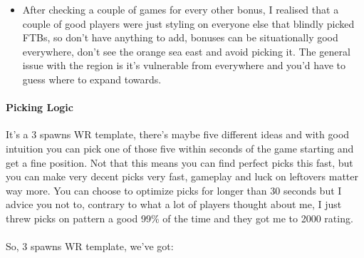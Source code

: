 \begin{itemize}
\begin{enumerate}
    \end{enumerate}
    \item After checking a couple of games for every other bonus, I realised that a couple of good players were just styling on everyone else that blindly picked FTBs, so don't have anything to add, bonuses can be situationally good everywhere, don't see the orange sea east and avoid picking it. The general issue with the region is it's vulnerable from everywhere and you'd have to guess where to expand towards.
\end{itemize}

\paragraph{Picking Logic}

It's a 3 spawns WR template, there's maybe five different ideas and with good intuition you can pick one of those five within seconds of the game starting and get a fine position. Not that this means you can find perfect picks this fast, but you can make very decent picks very fast, gameplay and luck on leftovers matter way more. You can choose to optimize picks for longer than 30 seconds but I advice you not to, contrary to what a lot of players thought about me, I just threw picks on pattern a good 99\% of the time and they got me to 2000 rating.
\\
\\
So, 3 spawns WR template, we've got:

